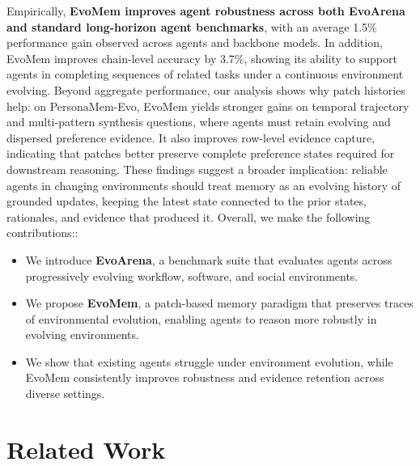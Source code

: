 \documentclass{article}
\begin{document}
Empirically, \textbf{EvoMem improves agent robustness across both EvoArena and standard long-horizon agent benchmarks}, with an average 1.5\% performance gain observed across agents and backbone models. 
In addition, EvoMem improves chain-level accuracy by 3.7\%, showing its ability to support agents in completing sequences of related tasks under a continuous environment evolving.
Beyond aggregate performance, our analysis shows why patch histories help: on PersonaMem-Evo, EvoMem yields stronger gains on temporal trajectory and multi-pattern synthesis questions, where agents must retain evolving and dispersed preference evidence. It also improves row-level evidence capture, indicating that patches better preserve complete preference states required for downstream reasoning. These findings suggest a broader implication: reliable agents in changing environments should treat memory as an evolving history of grounded updates, keeping the latest state connected to the prior states, rationales, and evidence that produced it. Overall, we make the following contributions::
\begin{itemize}
    \item We introduce \textbf{EvoArena}, a benchmark suite that evaluates agents across progressively evolving workflow, software, and social environments.
    \item We propose \textbf{EvoMem}, a patch-based memory paradigm that preserves traces of environmental evolution, enabling agents to reason more robustly in evolving environments.
    \item We show that existing agents struggle under environment evolution, while EvoMem consistently improves robustness and evidence retention across diverse settings.
\end{itemize}

\vspace{-3mm}




\section{Related Work}
\vspace{-1mm}
\end{document}

